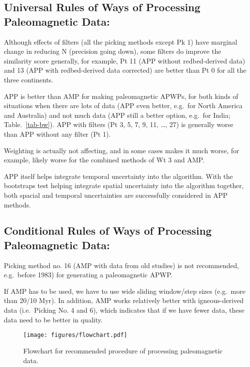 \subsection{Universal Rules of Ways of Processing Paleomagnetic Data:}
%
\begin{description}
  \item Although effects of filters (all the picking methods except Pk 1) have
		marginal change in reducing N (precision going down), some filters do
		improve the similarity score generally, for example, Pt 11 (APP without
		redbed-derived data) and 13 (APP with redbed-derived data corrected) are
		better than Pt 0 for all the three continents.
  \item APP is better than AMP for making paleomagnetic APWPs, for both kinds
		of situations when there are lots of data (APP even better, e.g.\ for
		North America and Australia) and not much data (APP still a better
		option, e.g.\ for India; Table.~\ref{tab-bw}). APP with filters (Pt
		3, 5, 7, 9, 11, \ldots, 27) is generally worse than APP without any
		filter (Pt 1).
  \item Weighting is actually not affecting, and in some cases makes it much
		worse, for example, likely worse for the combined methods of Wt 3 and
		AMP.
  \item APP itself helps integrate temporal uncertainty into the algorithm. With
		the bootstraps test helping integrate spatial uncertainty into the
		algorithm together, both spacial and temporal uncertainties are
		successfully considered in APP methods.
\end{description}

\subsection{Conditional Rules of Ways of Processing Paleomagnetic Data:}
%
\begin{description}
  \item Picking method no. 16 (AMP with data from old studies) is not
		recommended, e.g.\ before 1983) for generating a paleomagnetic APWP.
  \item If AMP has to be used, we have to use wide sliding window/step sizes
		(e.g.\ more than 20/10 Myr). In addition, AMP works relatively better
		with igneous-derived data (i.e.\ Picking No. 4 and 6), which indicates
		that if we have fewer data, these data need to be better in quality.
\end{description}

\begin{figure*}
\centering
\texttt{[image: figures/flowchart.pdf]}
\caption[Flowchart]{Flowchart for recommended procedure of processing
  paleomagnetic data.}\label{fig-flow}
\end{figure*}

